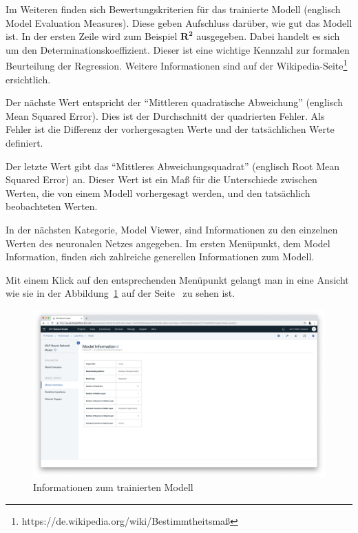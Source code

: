 Im Weiteren finden sich Bewertungskriterien für das trainierte Modell (englisch Model Evaluation Measures). Diese geben
Aufschluss darüber, wie gut das Modell ist. In der ersten Zeile wird zum Beispiel $\mathbf{R^2}$ ausgegeben.  Dabei
handelt es sich um den Determinationskoeffizient. Dieser ist eine wichtige Kennzahl zur formalen Beurteilung der
Regression. Weitere Informationen sind auf der Wikipedia-Seite\footnote{https://de.wikipedia.org/wiki/Bestimmtheitsmaß}
ersichtlich.

Der nächste Wert entspricht der \enquote{Mittleren quadratische Abweichung} (englisch Mean Squared Error). Dies ist der
Durchschnitt der quadrierten Fehler. Als Fehler ist die Differenz der vorhergesagten Werte und der tatsächlichen Werte
definiert.

Der letzte Wert gibt das \enquote{Mittleres Abweichungsquadrat} (englisch Root Mean Squared Error) an. Dieser Wert ist
ein Maß für die Unterschiede zwischen Werten, die von einem Modell vorhergesagt werden, und den tatsächlich beobachteten
Werten.

In der nächsten Kategorie, Model Viewer, sind Informationen zu den einzelnen Werten des neuronalen Netzes angegeben.
Im ersten Menüpunkt, dem Model Information, finden sich zahlreiche generellen Informationen zum Modell.

Mit einem Klick auf den entsprechenden Menüpunkt gelangt man in eine Ansicht wie sie in der
Abbildung~\ref{fig:umsetzung_model_information} auf der Seite~\pageref{fig:umsetzung_model_information} zu sehen ist.

\begin{figure}[h]
    \centering
    \includegraphics[width=\textwidth]{images/kapitel_3/model_information.png}
    \caption{Informationen zum trainierten Modell}
    \label{fig:umsetzung_model_information}
\end{figure}

